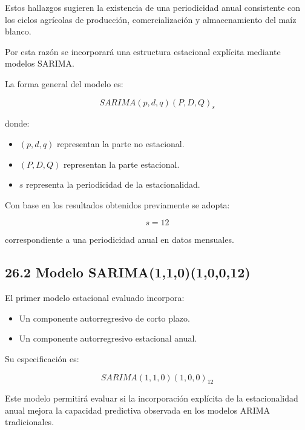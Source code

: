 \documentclass[11pt]{article}
\providecommand{\tightlist}{%
      \setlength{\itemsep}{0pt}\setlength{\parskip}{0pt}}
\begin{document}
Estos hallazgos sugieren la existencia de una periodicidad anual
consistente con los ciclos agrícolas de producción, comercialización y
almacenamiento del maíz blanco.

Por esta razón se incorporará una estructura estacional explícita
mediante modelos SARIMA.

La forma general del modelo es:

\[
SARIMA(p,d,q)(P,D,Q)_s
\]

donde:

\begin{itemize}
\tightlist
\item
  \((p,d,q)\) representan la parte no estacional.
\item
  \((P,D,Q)\) representan la parte estacional.
\item
  \(s\) representa la periodicidad de la estacionalidad.
\end{itemize}

Con base en los resultados obtenidos previamente se adopta:

\[
s = 12
\]

correspondiente a una periodicidad anual en datos mensuales.

    \hypertarget{modelo-sarima11010012}{%
\subsection{26.2 Modelo
SARIMA(1,1,0)(1,0,0,12)}\label{modelo-sarima11010012}}

El primer modelo estacional evaluado incorpora:

\begin{itemize}
\tightlist
\item
  Un componente autorregresivo de corto plazo.
\item
  Un componente autorregresivo estacional anual.
\end{itemize}

Su especificación es:

\[
SARIMA(1,1,0)(1,0,0)_{12}
\]

Este modelo permitirá evaluar si la incorporación explícita de la
estacionalidad anual mejora la capacidad predictiva observada en los
modelos ARIMA tradicionales.
\end{document}
